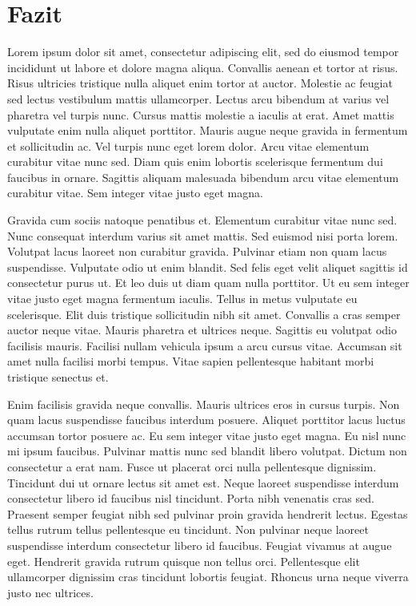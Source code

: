 \documentclass[
  11pt,
  a4paper,
  openright,
  cleardoublepage=plain,
  parskip=half+, %
]{scrreprt}
\begin{document}
\chapter{Fazit}\label{fazit}

Lorem ipsum dolor sit amet, consectetur adipiscing elit, sed do eiusmod
tempor incididunt ut labore et dolore magna aliqua. Convallis aenean et
tortor at risus. Risus ultricies tristique nulla aliquet enim tortor at
auctor. Molestie ac feugiat sed lectus vestibulum mattis ullamcorper.
Lectus arcu bibendum at varius vel pharetra vel turpis nunc. Cursus
mattis molestie a iaculis at erat. Amet mattis vulputate enim nulla
aliquet porttitor. Mauris augue neque gravida in fermentum et
sollicitudin ac. Vel turpis nunc eget lorem dolor. Arcu vitae elementum
curabitur vitae nunc sed. Diam quis enim lobortis scelerisque fermentum
dui faucibus in ornare. Sagittis aliquam malesuada bibendum arcu vitae
elementum curabitur vitae. Sem integer vitae justo eget magna.

Gravida cum sociis natoque penatibus et. Elementum curabitur vitae nunc
sed. Nunc consequat interdum varius sit amet mattis. Sed euismod nisi
porta lorem. Volutpat lacus laoreet non curabitur gravida. Pulvinar
etiam non quam lacus suspendisse. Vulputate odio ut enim blandit. Sed
felis eget velit aliquet sagittis id consectetur purus ut. Et leo duis
ut diam quam nulla porttitor. Ut eu sem integer vitae justo eget magna
fermentum iaculis. Tellus in metus vulputate eu scelerisque. Elit duis
tristique sollicitudin nibh sit amet. Convallis a cras semper auctor
neque vitae. Mauris pharetra et ultrices neque. Sagittis eu volutpat
odio facilisis mauris. Facilisi nullam vehicula ipsum a arcu cursus
vitae. Accumsan sit amet nulla facilisi morbi tempus. Vitae sapien
pellentesque habitant morbi tristique senectus et.

Enim facilisis gravida neque convallis. Mauris ultrices eros in cursus
turpis. Non quam lacus suspendisse faucibus interdum posuere. Aliquet
porttitor lacus luctus accumsan tortor posuere ac. Eu sem integer vitae
justo eget magna. Eu nisl nunc mi ipsum faucibus. Pulvinar mattis nunc
sed blandit libero volutpat. Dictum non consectetur a erat nam. Fusce ut
placerat orci nulla pellentesque dignissim. Tincidunt dui ut ornare
lectus sit amet est. Neque laoreet suspendisse interdum consectetur
libero id faucibus nisl tincidunt. Porta nibh venenatis cras sed.
Praesent semper feugiat nibh sed pulvinar proin gravida hendrerit
lectus. Egestas tellus rutrum tellus pellentesque eu tincidunt. Non
pulvinar neque laoreet suspendisse interdum consectetur libero id
faucibus. Feugiat vivamus at augue eget. Hendrerit gravida rutrum
quisque non tellus orci. Pellentesque elit ullamcorper dignissim cras
tincidunt lobortis feugiat. Rhoncus urna neque viverra justo nec
ultrices.
\newpage
\end{document}
